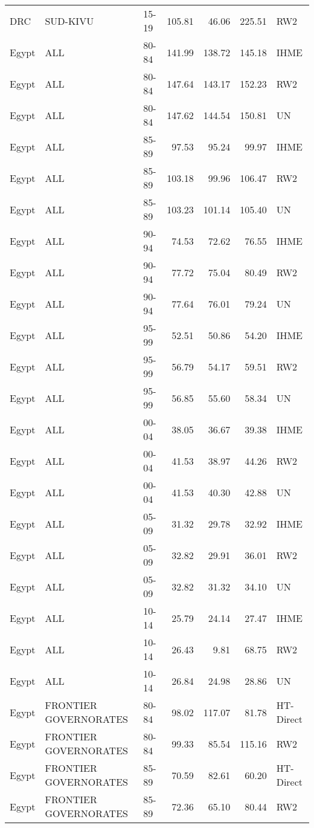 \begin{longtable}{lllrrrl}
  DRC & SUD-KIVU & 15-19 & 105.81 & 46.06 & 225.51 & RW2 \\ 
  Egypt & ALL & 80-84 & 141.99 & 138.72 & 145.18 & IHME \\ 
  Egypt & ALL & 80-84 & 147.64 & 143.17 & 152.23 & RW2 \\ 
  Egypt & ALL & 80-84 & 147.62 & 144.54 & 150.81 & UN \\ 
  Egypt & ALL & 85-89 & 97.53 & 95.24 & 99.97 & IHME \\ 
  Egypt & ALL & 85-89 & 103.18 & 99.96 & 106.47 & RW2 \\ 
  Egypt & ALL & 85-89 & 103.23 & 101.14 & 105.40 & UN \\ 
  Egypt & ALL & 90-94 & 74.53 & 72.62 & 76.55 & IHME \\ 
  Egypt & ALL & 90-94 & 77.72 & 75.04 & 80.49 & RW2 \\ 
  Egypt & ALL & 90-94 & 77.64 & 76.01 & 79.24 & UN \\ 
  Egypt & ALL & 95-99 & 52.51 & 50.86 & 54.20 & IHME \\ 
  Egypt & ALL & 95-99 & 56.79 & 54.17 & 59.51 & RW2 \\ 
  Egypt & ALL & 95-99 & 56.85 & 55.60 & 58.34 & UN \\ 
  Egypt & ALL & 00-04 & 38.05 & 36.67 & 39.38 & IHME \\ 
  Egypt & ALL & 00-04 & 41.53 & 38.97 & 44.26 & RW2 \\ 
  Egypt & ALL & 00-04 & 41.53 & 40.30 & 42.88 & UN \\ 
  Egypt & ALL & 05-09 & 31.32 & 29.78 & 32.92 & IHME \\ 
  Egypt & ALL & 05-09 & 32.82 & 29.91 & 36.01 & RW2 \\ 
  Egypt & ALL & 05-09 & 32.82 & 31.32 & 34.10 & UN \\ 
  Egypt & ALL & 10-14 & 25.79 & 24.14 & 27.47 & IHME \\ 
  Egypt & ALL & 10-14 & 26.43 & 9.81 & 68.75 & RW2 \\ 
  Egypt & ALL & 10-14 & 26.84 & 24.98 & 28.86 & UN \\ 
  Egypt & FRONTIER GOVERNORATES & 80-84 & 98.02 & 117.07 & 81.78 & HT-Direct \\ 
  Egypt & FRONTIER GOVERNORATES & 80-84 & 99.33 & 85.54 & 115.16 & RW2 \\ 
  Egypt & FRONTIER GOVERNORATES & 85-89 & 70.59 & 82.61 & 60.20 & HT-Direct \\ 
  Egypt & FRONTIER GOVERNORATES & 85-89 & 72.36 & 65.10 & 80.44 & RW2 \\ 

\end{longtable}
